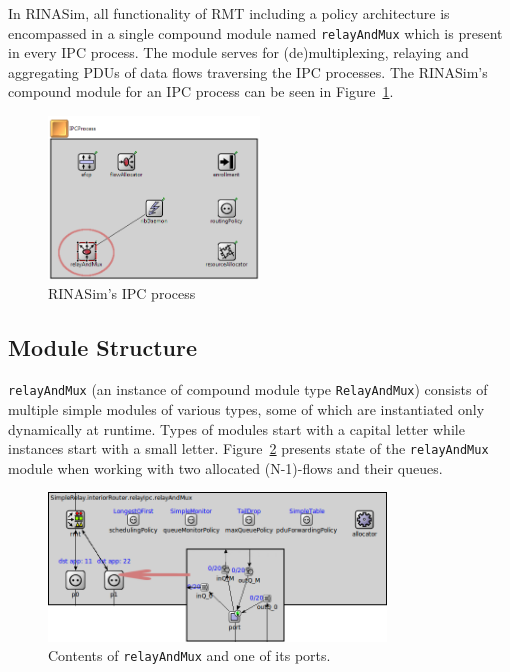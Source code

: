         In RINASim, all functionality of RMT including a policy architecture is encompassed in a single compound module named \texttt{relayAndMux} which is present in every IPC process. The module serves for (de)multiplexing, relaying and aggregating PDUs of data flows traversing the IPC processes. The RINASim's compound module for an IPC process can be seen in Figure~\ref{fig:rinasim:ipcp}.

        \begin{figure}[H]
                \begin{center}
                    \includegraphics[width=0.5\textwidth]{fig/impl_rinasim-ipcp.png}
                  \caption{RINASim's IPC process}
                  \label{fig:rinasim:ipcp}
                \end{center}
            \end{figure}

        \subsection{Module Structure}

            \texttt{relayAndMux} (an instance of compound module type \texttt{RelayAndMux}) consists of multiple simple modules of various types, some of which are instantiated only dynamically at runtime. Types of modules start with a capital letter while instances start with a small letter. Figure~\ref{fig:rinasim:rmt} presents state of the \texttt{relayAndMux} module when working with two allocated (N-1)-flows and their queues.

            \begin{figure}[H]
                \begin{center}
                    \includegraphics[width=0.8\textwidth]{fig/impl_rinasim-rmt.png}
                  \caption{Contents of \texttt{relayAndMux} and one of its ports.}
                  \label{fig:rinasim:rmt}
                \end{center}
            \end{figure}

